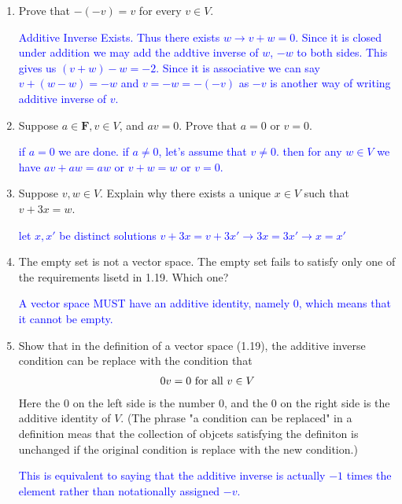 \documentclass[10pt,a4paper]{report}
\newcommand{\BLUE}[1]{\textcolor{blue}{#1}}
\newcommand{\F}{\textbf{F}}
\begin{document}
\begin{enumerate}

\item Prove that $-(-v)=v$ for every $v \in V$.

\BLUE{ Additive Inverse Exists.  Thus there exists $w \to v+w=0$.  Since it is closed under addition we may add the addtive inverse of $w$, $-w$ to both sides.  This gives us $(v+w)-w=-2$.  Since it is associative we can say $v+(w-w)= -w$ and $v=-w=-(-v)$ as $-v$ is another way of writing additive inverse of $v$.
}

\item Suppose $a \in \F, v\in V$, and $av=0$.  Prove that $a=0$ or $v=0$.

\BLUE{if $a=0$ we are done.  if $a \ne 0$, let's assume that $v \ne 0$.  then for any $w \in V$ we have $av+aw=aw$ or $v+w=w$ or $v=0$.
}

\item Suppose $v,w \in V$.  Explain why there exists a unique $x \in V$ such that $v+3x=w$.

\BLUE{let $x, x'$ be distinct solutions $v+3x=v+3x' \to 3x=3x' \to x=x'$
}

\item The empty set is not a vector space. The empty set fails to satisfy only one of the requirements lisetd in 1.19.  Which one?

\BLUE{A vector space MUST have an additive identity, namely 0, which means that it cannot be empty.
}

\item Show that in the definition of a vector space (1.19), the additive inverse condition can be replace with the condition that
\begin{align*}
	0v=0 \text{ for all } v \in V
\end{align*}
Here the 0 on the left side is the number 0, and the 0 on the right side is the additive identity of $V$.  (The phrase "a condition can be replaced" in a definition meas that the collection of objcets satisfying the definiton is unchanged if the original condition is replace with the new condition.)

\BLUE{This is equivalent to saying that the additive inverse is actually $-1$ times the element rather than notationally assigned $-v$.
}


\end{enumerate}
\end{document}
